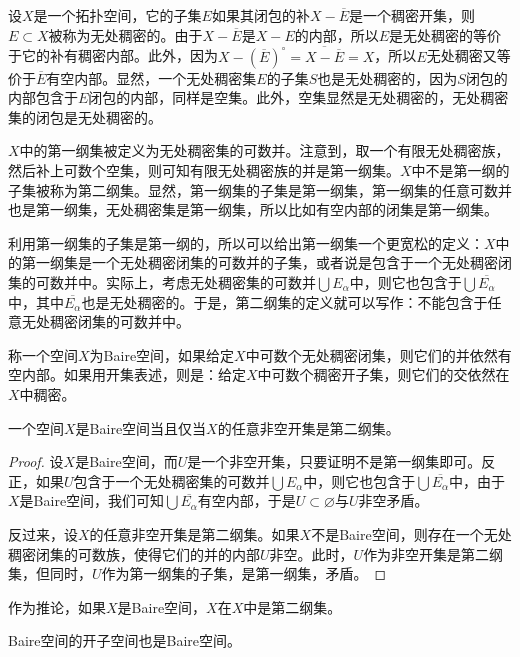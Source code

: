 \begin{para}[第一、第二纲集与Baire空间]
设$X$是一个拓扑空间，它的子集$E$如果其闭包的补$X-\overline{E}$是一个稠密开集，则$E\subset X$被称为无处稠密的。由于$X-\overline{E}$是$X-E$的内部，所以$E$是无处稠密的等价于它的补有稠密内部。此外，因为$X-(\overline{E})^\circ=\overline{X-\overline{E}}=X$，所以$E$无处稠密又等价于$\overline{E}$有空内部。显然，一个无处稠密集$E$的子集$S$也是无处稠密的，因为$S$闭包的内部包含于$E$闭包的内部，同样是空集。此外，空集显然是无处稠密的，无处稠密集的闭包是无处稠密的。

$X$中的第一纲集被定义为无处稠密集的可数并。注意到，取一个有限无处稠密族，然后补上可数个空集，则可知有限无处稠密族的并是第一纲集。$X$中不是第一纲的子集被称为第二纲集。显然，第一纲集的子集是第一纲集，第一纲集的任意可数并也是第一纲集，无处稠密集是第一纲集，所以比如有空内部的闭集是第一纲集。

利用第一纲集的子集是第一纲的，所以可以给出第一纲集一个更宽松的定义：$X$中的第一纲集是一个无处稠密闭集的可数并的子集，或者说是包含于一个无处稠密闭集的可数并中。实际上，考虑无处稠密集的可数并$\bigcup E_\alpha$中，则它也包含于$\bigcup \overline{E_\alpha}$中，其中$\overline{E_\alpha}$也是无处稠密的。于是，第二纲集的定义就可以写作：不能包含于任意无处稠密闭集的可数并中。

称一个空间$X$为Baire空间，如果给定$X$中可数个无处稠密闭集，则它们的并依然有空内部。如果用开集表述，则是：给定$X$中可数个稠密开子集，则它们的交依然在$X$中稠密。
\end{para}

\begin{lem}
	一个空间$X$是Baire空间当且仅当$X$的任意非空开集是第二纲集。
\end{lem}

\begin{proof}
	设$X$是Baire空间，而$U$是一个非空开集，只要证明不是第一纲集即可。反正，如果$U$包含于一个无处稠密集的可数并$\bigcup E_\alpha$中，则它也包含于$\bigcup \overline{E_\alpha}$中，由于$X$是Baire空间，我们可知$\bigcup \overline{E_\alpha}$有空内部，于是$U\subset \varnothing$与$U$非空矛盾。

	反过来，设$X$的任意非空开集是第二纲集。如果$X$不是Baire空间，则存在一个无处稠密闭集的可数族，使得它们的并的内部$U$非空。此时，$U$作为非空开集是第二纲集，但同时，$U$作为第一纲集的子集，是第一纲集，矛盾。
\end{proof}

作为推论，如果$X$是Baire空间，$X$在$X$中是第二纲集。

\begin{pro}
	Baire空间的开子空间也是Baire空间。
\end{pro}

